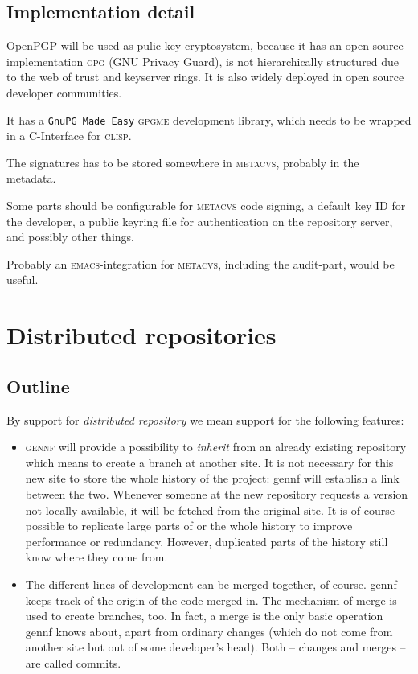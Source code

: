 \documentclass[fleqn, 10pt, a4paper]{article}
\begin{document}
\subsection{Implementation detail}
OpenPGP will be used as pulic key cryptosystem, because it has an
open-source implementation \textsc{gpg} (GNU Privacy Guard), is not
hierarchically structured due to the web of trust and keyserver rings.
It is also widely deployed in open source developer communities.

It has a \texttt{GnuPG Made Easy} \textsc{gpgme} development library,
which needs to be wrapped in a C-Interface for \textsc{clisp}.

The signatures has to be stored somewhere in \textsc{metacvs}, probably
in the metadata.

Some parts should be configurable for \textsc{metacvs} code signing,
a default key ID for the developer, a public keyring file for authentication
on the repository server, and possibly other things.

Probably an \textsc{emacs}-integration for \textsc{metacvs}, including the
audit-part, would be useful.


\section{Distributed repositories}

\subsection{Outline}

By support for \emph{distributed repository} we mean support for the following
features:

\begin{itemize}
\item \textsc{gennf} will provide a possibility to \emph{inherit} from an
already existing repository which means to create a branch
at another site. It is not necessary for this new site to store the
whole history of the project: gennf will establish a link between the two.
Whenever someone at the new repository requests a version not locally
available, it will be fetched from the original site. It is of course
possible to replicate large parts of or the whole history to improve
performance or redundancy. However, duplicated parts of the history still
know where they come from.

\item The different lines of development can be merged together, of course.
gennf keeps track of the origin of the code merged in. The mechanism
of merge is used to create branches, too. In fact, a merge is the only
basic operation gennf knows about, apart from ordinary changes (which
do not come from another site but out of some developer's head).
Both -- changes and merges -- are called commits.
\end{itemize}
\end{document}
